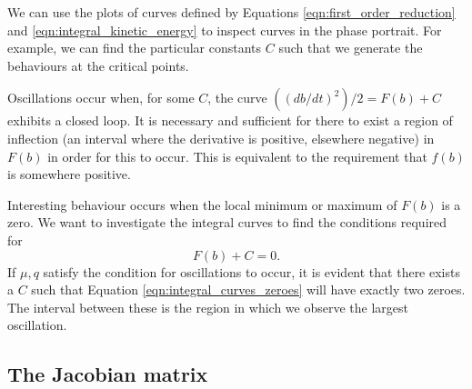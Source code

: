 We can use the plots of curves defined by Equations \ref{eqn:first_order_reduction} and \ref{eqn:integral_kinetic_energy} to inspect curves in the phase portrait.
For example, we can find the particular constants $C$ such that we generate the behaviours at the critical points.


Oscillations occur when, for some $C$, the curve $\left((db/dt)^2\right)/2 = F(b) + C$ exhibits a closed loop.
It is necessary and sufficient for there to exist a region of inflection (an interval where the derivative is positive,
elsewhere negative) in $F(b)$ in order for this to occur.
This is equivalent to the requirement that $f(b)$ is somewhere positive.

Interesting behaviour occurs when the local minimum or maximum of $F(b)$ is a zero.
We want to investigate the integral curves to find the conditions required for
\begin{equation}
	F(b) + C = 0.
	\label{eqn:integral_curves_zeroes}
\end{equation}
If $\mu, q$ satisfy the condition for oscillations to occur,
it is evident that there exists a $C$ such that Equation \ref{eqn:integral_curves_zeroes} will have exactly two zeroes.
The interval between these is the region in which we observe the largest oscillation.

\subsection{The Jacobian matrix}

